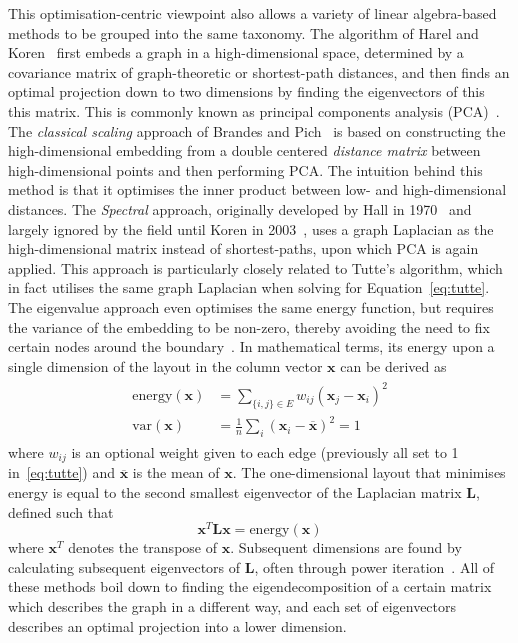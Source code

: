 This optimisation-centric viewpoint also allows a variety of linear algebra-based methods to be grouped into the same taxonomy.
The algorithm of Harel and Koren~\cite{Harel2004} first embeds a graph in a high-dimensional space, determined by a covariance matrix of graph-theoretic or shortest-path distances, and then finds an optimal projection down to two dimensions by finding the eigenvectors of this this matrix. This is commonly known as principal components analysis (PCA)~\cite{Pearson1901}.
The \emph{classical scaling} approach of Brandes and Pich~\cite{Brandes2007} is based on constructing the high-dimensional embedding from a double centered \emph{distance matrix} between high-dimensional points and then performing PCA. The intuition behind this method is that it optimises the inner product between low- and high-dimensional distances.
The \emph{Spectral} approach, originally developed by Hall in 1970~\cite{Hall1970} and largely ignored by the field until Koren in 2003~\cite{Koren2003}, uses a graph Laplacian as the high-dimensional matrix instead of shortest-paths, upon which PCA is again applied. This approach is particularly closely related to Tutte's algorithm, which in fact utilises the same graph Laplacian when solving for Equation~\eqref{eq:tutte}.
The eigenvalue approach even optimises the same energy function, but requires the variance of the embedding to be non-zero, thereby avoiding the need to fix certain nodes around the boundary~\cite{Koren2003}.
In mathematical terms, its energy upon a single dimension of the layout in the column vector $\mathbf{x}$ can be derived as
\begin{align}
\begin{split}
    \mathrm{energy}(\mathbf{x}) &= \sum_{\{i,j\}\in E}w_{ij}(\mathbf{x}_j-\mathbf{x}_i)^2\\
    \mathrm{var}(\mathbf{x}) &= \frac{1}{n}\sum_i(\mathbf{x}_i-\overline{\mathbf{x}})^2 = 1
\end{split}
\label{eq:spectral}
\end{align}
where $w_{ij}$ is an optional weight given to each edge (previously all set to 1 in~\eqref{eq:tutte}) and $\overline{\mathbf{x}}$ is the mean of $\mathbf{x}$. The one-dimensional layout that minimises energy is equal to the second smallest eigenvector of the Laplacian matrix $\mathbf{L}$, defined such that
\begin{equation}
    \mathbf{x}^T\mathbf{Lx} = \mathrm{energy}(\mathbf{x})
\end{equation}
where $\mathbf{x}^T$ denotes the transpose of $\mathbf{x}$. Subsequent dimensions are found by calculating subsequent eigenvectors of $\mathbf{L}$, often through power iteration~\cite{Koren2003}.
All of these methods boil down to finding the eigendecomposition of a certain matrix which describes the graph in a different way, and each set of eigenvectors describes an optimal projection into a lower dimension.

